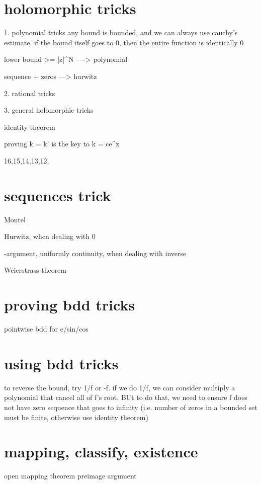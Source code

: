 \section*{holomorphic tricks}
1. polynomial tricks
	any bound is bounded, and we can always use cauchy's estimate.
	if the bound itself goes to 0, then the entire function is identically 0

	lower bound
		>= |z|^N ----> polynomial
		

	
	
	
	sequence + zeros ---> hurwitz
	

2. rational tricks

3. general holomorphic tricks

	identity theorem
	
	proving k = k' is the key to k = ce^z


16,15,14,13,12,

\section*{sequences trick}
	Montel
	
	Hurwitz, when dealing with 0
	
	\epsilon-\delta argument, uniformly continuity, when dealing with inverse
	
	Weierstrass theorem

\section*{proving bdd tricks}
	pointwise bdd for e/sin/cos

\section*{using bdd tricks}
	to reverse the bound, try 1/f or -f. 
		if we do 1/f, we can consider multiply a polynomial that cancel all of f's root. BUt to do that, we need to ensure f does not have zero sequence that goes to infinity (i.e. number of zeros in a bounded set must be finite, otherwise use identity theorem)



	


\section*{mapping, classify, existence}
	open mapping theorem 
	preimage argument




